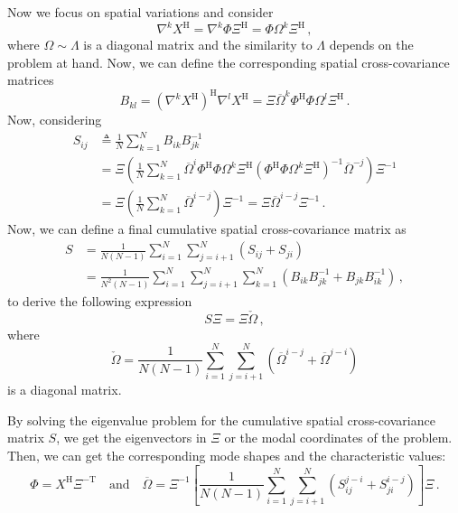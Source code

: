 \documentclass[10pt]{article}
\begin{document}
Now we focus on spatial variations and consider
\begin{equation}
	\nabla^k X^\mathrm{H} = \nabla^k \Phi \Xi ^\mathrm{H}  = \Phi \Omega^k \Xi ^\mathrm{H}\,, 
\end{equation}
where $\Omega \sim \Lambda$ is a diagonal matrix and the similarity to $\Lambda$ depends on the problem at hand.
Now, we can define the corresponding spatial cross-covariance matrices
\begin{equation}
	B_{kl} = \left({\nabla}^k X^\mathrm{H}\right)^\mathrm{H} {\nabla}^l X^\mathrm{H} = \Xi \overline \Omega^k \Phi^\mathrm{H}  \Phi \Omega^l \Xi^\mathrm{H}\,.
\end{equation}
Now, considering
\begin{align}
	S_{ij} &\triangleq \frac{1}{N}\sum_{k=1}^N B_{ik}B_{jk}^{-1}\\ 
	&= \Xi \left(\frac{1}{N}\sum_{k=1}^N \overline \Omega^i \Phi^\mathrm{H} \Phi \Omega^k \Xi^\mathrm{H} \left( \Phi^\mathrm{H}\Phi \Omega^k \Xi^\mathrm{H}\right)^{-1}\overline \Omega^{-j}\right)\Xi^{-1}\\
	&= \Xi \left(\frac{1}{N}\sum_{k=1}^N  \overline \Omega^{i-j} \right) \Xi^{-1} = \Xi \overline \Omega^{i-j} \Xi^{-1}\,.
\end{align}
Now, we can define a final cumulative spatial cross-covariance matrix as
\begin{equation}
\begin{aligned}
	S &= \frac{1}{N(N-1)}\sum_{i=1}^N\sum_{j=i+1}^N \left(S_{ij} + S_{ji}\right)\\
	&= \frac{1}{N^2(N-1)}\sum_{i=1}^N\sum_{j=i+1}^N \sum_{k=1}^N \left(B_{ik} B_{jk}^{-1} + B_{jk} B_{ik}^{-1}\right)\,,
\end{aligned}
\end{equation}
to derive the following expression
\begin{equation}
	S\Xi = \Xi \check  \Omega \,,
\end{equation}
where
\begin{equation}
		\check  \Omega = \frac{1}{N(N-1)}\sum_{i=1}^N\sum_{j=i+1}^N \left( \overline\Omega^{i-j} + \overline\Omega^{j-i} \right)
\end{equation}
is a diagonal matrix.

By solving the eigenvalue problem for the cumulative spatial cross-covariance matrix $S$, we get the eigenvectors in $\Xi$ or the modal coordinates of the problem.
Then, we can get the corresponding mode shapes and the characteristic values:
\begin{equation}
	\Phi = X^\mathrm{H} \Xi^\mathrm{-T} \quad \mathrm{and} \quad \overline\Omega = \Xi^{-1}\left[\frac{1}{N(N-1)}\sum_{i=1}^N\sum_{j=i+1}^N \left(S_{ij}^{j-i}+S_{ji}^{i-j}\right)\right] \Xi\,.
\end{equation}
\end{document}
